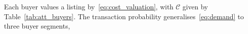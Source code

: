 Each buyer values a listing by~\eqref{eq:cost_valuation}, with $\mathcal C$ given by Table~\ref{tab:att_buyers}. The transaction probability generalises~\eqref{eq:demand} to three buyer segments,
